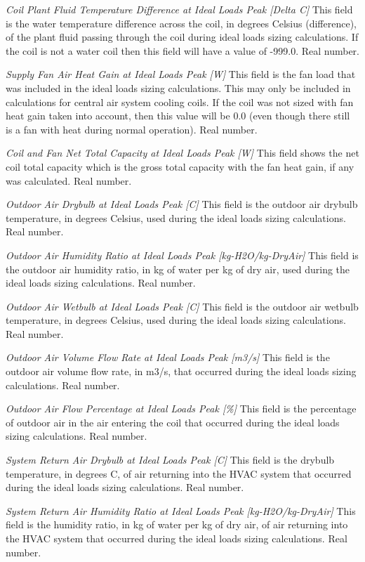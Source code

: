 \emph{Coil Plant Fluid Temperature Difference at Ideal Loads Peak [Delta C]}  This field is the water temperature difference across the coil, in degrees Celsius (difference), of the plant fluid passing through the coil during ideal loads sizing calculations.  If the coil is not a water coil then this field will have a value of -999.0. Real number.

\emph{Supply Fan Air Heat Gain at Ideal Loads Peak [W]}  This field is the fan load that was included in the ideal loads sizing calculations.  This may only be included in calculations for central air system cooling coils.  If the coil was not sized with fan heat gain taken into account, then this value will be 0.0 (even though there still is a fan with heat during normal operation).  Real number.

\emph{Coil and Fan Net Total Capacity at Ideal Loads Peak [W]}  This field shows the net coil total capacity which is the gross total capacity with the fan heat gain, if any was calculated.  Real number.

\emph{Outdoor Air Drybulb at Ideal Loads Peak [C]}  This field is the outdoor air drybulb temperature, in degrees Celsius, used during the ideal loads sizing calculations.  Real number.

\emph{Outdoor Air Humidity Ratio at Ideal Loads Peak [kg-H2O/kg-DryAir]} This field is the outdoor air humidity ratio, in kg of water per kg of dry air, used during the ideal loads sizing calculations.  Real number.

\emph{Outdoor Air Wetbulb at Ideal Loads Peak [C]}  This field is the outdoor air wetbulb temperature, in degrees Celsius, used during the ideal loads sizing calculations.  Real number.

\emph{Outdoor Air Volume Flow Rate at Ideal Loads Peak [m3/s]}  This field is the outdoor air volume flow rate, in m3/s, that occurred during the ideal loads sizing calculations. Real number.

\emph{Outdoor Air Flow Percentage at Ideal Loads Peak [\%]}  This field is the percentage of outdoor air in the air entering the coil that occurred during the ideal loads sizing calculations. Real number.

\emph{System Return Air Drybulb at Ideal Loads Peak [C]}  This field is the drybulb temperature, in degrees C, of air returning into the HVAC system that occurred during the ideal loads sizing calculations. Real number.

\emph{System Return Air Humidity Ratio at Ideal Loads Peak [kg-H2O/kg-DryAir]}  This field is the humidity ratio, in kg of water per kg of dry air, of air returning into the HVAC system that occurred during the ideal loads sizing calculations. Real number.

